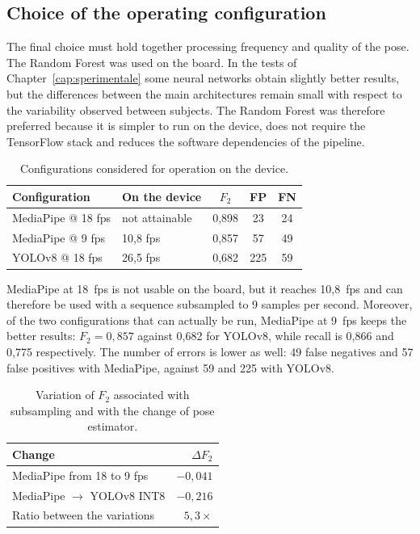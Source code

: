 \subsection{Choice of the operating configuration}
\label{sec:decisione}

The final choice must hold together processing frequency and quality of the pose. The Random Forest was used on the board. In the tests of Chapter~\ref{cap:sperimentale} some neural networks obtain slightly better results, but the differences between the main architectures remain small with respect to the variability observed between subjects. The Random Forest was therefore preferred because it is simpler to run on the device, does not require the TensorFlow stack and reduces the software dependencies of the pipeline.

\begin{table}[htbp]
\centering
\caption{Configurations considered for operation on the device.}
\label{tab:catene}
\begin{tabular}{llccc}
\toprule \textbf{Configuration} & \textbf{On the device} & \textbf{$F_2$} & \textbf{FP} & \textbf{FN} \\
\midrule
MediaPipe @ 18 fps & not attainable & 0,898 & 23 & 24 \\
MediaPipe @ 9 fps & 10,8 fps & 0,857 & 57 & 49 \\
YOLOv8 @ 18 fps & 26,5 fps & 0,682 & 225 & 59 \\
\bottomrule
\end{tabular}
\end{table}

MediaPipe at 18~fps is not usable on the board, but it reaches 10,8~fps and can therefore be used with a sequence subsampled to 9 samples per second. Moreover, of the two configurations that can actually be run, MediaPipe at 9~fps keeps the better results: $F_2=0{,}857$ against 0,682 for YOLOv8, while recall is 0,866 and 0,775 respectively. The number of errors is lower as well: 49 false negatives and 57 false positives with MediaPipe, against 59 and 225 with YOLOv8.

\begin{table}[htbp]
\centering
\caption{Variation of $F_2$ associated with subsampling and with the change of pose estimator.}
\label{tab:scomposizione}
\begin{tabular}{lr}
\toprule
\textbf{Change} & \textbf{$\Delta F_2$} \\
\midrule MediaPipe from 18 to 9 fps & $-0{,}041$ \\
MediaPipe $\rightarrow$ YOLOv8 INT8 & $-0{,}216$ \\
\midrule Ratio between the variations & $5{,}3\times$ \\
\bottomrule
\end{tabular}
\end{table}

